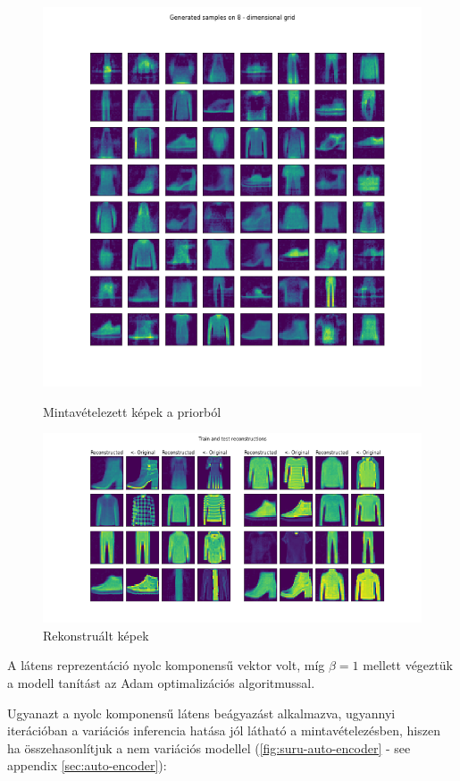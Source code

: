\documentclass[12pt, english]{article}
\begin{document}
\begin{figure}[H] 
  \label{fig:auto_encoder_results} 
  \begin{minipage}{0.5\linewidth}
    \centering
    \includegraphics[width=.65\linewidth]{gen/generated_samples_fashion_mnist_dense_vae.png} 
    \caption{Mintavételezett képek a priorból} 
  \end{minipage}%
  \begin{minipage}{0.5\linewidth}
    \centering
    \includegraphics[width=.95\linewidth]{reco/reconstrunction_samples_fashion_mnist_dense_vae.png} 
    \caption{Rekonstruált képek} 
  \end{minipage} 
\end{figure}

\vspace{4mm}

\par A látens reprezentáció nyolc komponensű vektor volt, míg $\beta = 1$ mellett végeztük a modell tanítást az Adam \cite{kingma2014adam} optimalizációs algoritmussal.
\vspace{4mm}

\par Ugyanazt a nyolc komponensű látens beágyazást alkalmazva, ugyannyi iterációban a variációs inferencia hatása jól látható a mintavételezésben, hiszen ha összehasonlítjuk a nem variációs modellel (\ref{fig:suru-auto-encoder} - see appendix \ref{sec:auto-encoder}):
\end{document}
